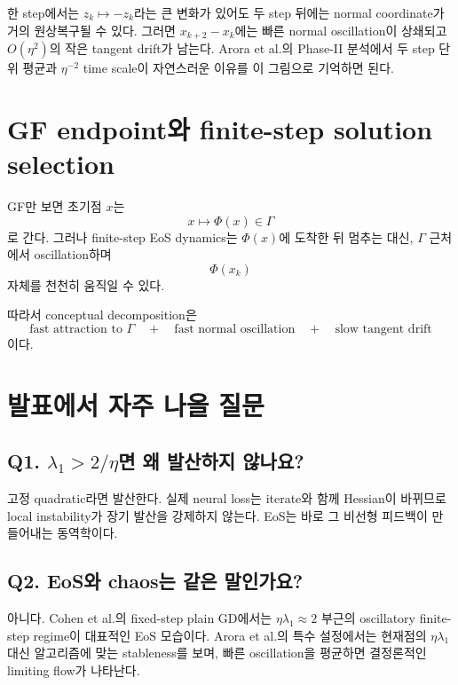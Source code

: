 \documentclass[11pt,a4paper,oneside,openany]{memoir}
\theoremstyle{definition}
\begin{document}
\begin{suppbox}
한 step에서는 $z_k\mapsto-z_k$라는 큰 변화가 있어도 두 step 뒤에는 normal coordinate가 거의 원상복구될 수 있다.
그러면 $x_{k+2}-x_k$에는 빠른 normal oscillation이 상쇄되고 $O(\eta^2)$의 작은 tangent drift가 남는다.
Arora et al.의 Phase-II 분석에서 두 step 단위 평균과 $\eta^{-2}$ time scale이 자연스러운 이유를 이 그림으로 기억하면 된다.
\end{suppbox}

\section{GF endpoint와 finite-step solution selection}

GF만 보면 초기점 $x$는
\begin{equation}
  x\longmapsto\Phi(x)\in\Gamma
\end{equation}
로 간다. 그러나 finite-step EoS dynamics는 $\Phi(x)$에 도착한 뒤 멈추는 대신,
$\Gamma$ 근처에서 oscillation하며
\begin{equation}
  \Phi(x_k)
\end{equation}
자체를 천천히 움직일 수 있다.

따라서 conceptual decomposition은
\begin{equation}
  \boxed{
  \text{fast attraction to }\Gamma
  \quad+\quad
  \text{fast normal oscillation}
  \quad+\quad
  \text{slow tangent drift}
  }
\end{equation}
이다.

\section{발표에서 자주 나올 질문}

\subsection*{Q1. $\lambda_1>2/\eta$면 왜 발산하지 않나요?}
고정 quadratic라면 발산한다. 실제 neural loss는 iterate와 함께 Hessian이 바뀌므로 local instability가 장기 발산을 강제하지 않는다.
EoS는 바로 그 비선형 피드백이 만들어내는 동역학이다.

\subsection*{Q2. EoS와 chaos는 같은 말인가요?}
아니다. Cohen et al.의 fixed-step plain GD에서는 $\eta\lambda_1\approx2$ 부근의 oscillatory finite-step regime이 대표적인 EoS 모습이다.
Arora et al.의 특수 설정에서는 현재점의 $\eta\lambda_1$ 대신 알고리즘에 맞는 stableness를 보며,
빠른 oscillation을 평균하면 결정론적인 limiting flow가 나타난다.
\end{document}
